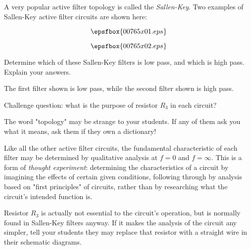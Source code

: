 

A very popular active filter topology is called the {\it Sallen-Key}.  Two examples of Sallen-Key active filter circuits are shown here:

$$\epsfbox{00765x01.eps}$$

$$\epsfbox{00765x02.eps}$$

Determine which of these Sallen-Key filters is low pass, and which is high pass.  Explain your answers.  







The first filter shown is low pass, while the second filter shown is high pass.

\vskip 10pt

Challenge question: what is the purpose of resistor $R_3$ in each circuit?







The word "topology" may be strange to your students.  If any of them ask you what it means, ask them if they own a dictionary!

Like all the other active filter circuits, the fundamental characteristic of each filter may be determined by qualitative analysis at $f = 0$ and $f = \infty$.  This is a form of {\it thought experiment}: determining the characteristics of a circuit by imagining the effects of certain given conditions, following through by analysis based on "first principles" of circuits, rather than by researching what the circuit's intended function is.

Resistor $R_3$ is actually not essential to the circuit's operation, but is normally found in Sallen-Key filters anyway.  If it makes the analysis of the circuit any simpler, tell your students they may replace that resistor with a straight wire in their schematic diagrams.




